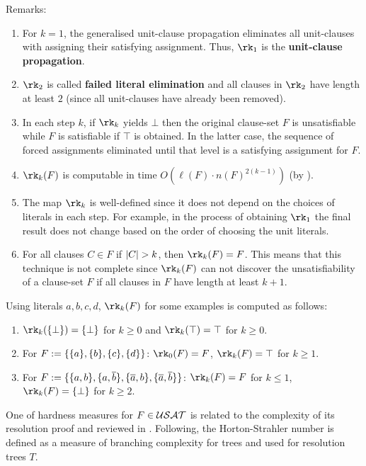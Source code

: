 \documentclass{report}
\begin{document}
Remarks:
\begin{enumerate}
  \item For $k=1$, the generalised unit-clause propagation eliminates all unit-clauses with assigning their satisfying assignment. Thus, $\rk_1$ is the \textbf{unit-clause propagation}.
  \item $\rk_2$ is called \textbf{failed literal elimination} and all clauses in $\rk_2$ have length at least $2$ (since all unit-clauses have already been removed).
  \item In each step $k$, if $\rk_k$ yields $\bot$ then the original clause-set $F$ is unsatisfiable while $F$ is satisfiable if $\top$ is obtained. In the latter case, the sequence of forced assignments eliminated until that level is a satisfying assignment for $F$.
  \item $\rk_k(F)$ is computable in time $O(\ell(F) \cdot n(F)^{2(k-1)})$ (by \cite{GwynneKullmann2012Slur}).
  \item The map $\rk_k$ is well-defined since it does not depend on the choices of literals in each step. For example, in the process of obtaining  $\rk_1$ the final result does not change based on the order of choosing the unit literals. 
  \item For all clauses $C \in F$ if $\lvert C \rvert > k$, then $\rk_k(F) = F$. This means that this technique is not complete since $\rk_k(F)$ can not discover the unsatisfiability of a clause-set $F$ if all clauses in $F$ have length at least $k+1$.
\end{enumerate}

\begin{examp}\label{exp:rk}
Using literals $a,b,c,d$, $\rk_k(F)$ for some examples is computed as follows:
  \begin{enumerate}
  \item $\rk_k(\set{\bot}) = \set{\bot}$ for $k \ge 0$ and $\rk_k(\top) = \top$ for $k \ge 0$.
  \item For $F := \{ \{ a \},\{ b \},\{ c \},\{ d \} \}$: $\rk_0(F) = F$, $\rk_k(F) = \top$ for $k \ge 1$.
  \item For $F := \{ \{ a,b \},\{ a,\overline{b} \}, \{ \overline{a},b \},\{ \overline{a},\overline{b} \} \}$: $\rk_k(F) = F$ for $k \le 1$, $\rk_k(F) = \set{\bot}$ for $k \ge 2$.
  \end{enumerate}
\end{examp}

One of hardness measures for $F \in \mathcal{USAT}$ is related to the complexity of its resolution proof and reviewed in \cite{GwynneKullmann2013GoodRepresentationsIIex, BeyersdorffKullmann2014PHP,BeyersdorffGwynneKullmann2013PHPER,GwynneKullmann2012Slur}. Following, the Horton-Strahler number is defined as a measure of branching complexity for trees and used for resolution trees $T$.
\end{document}
